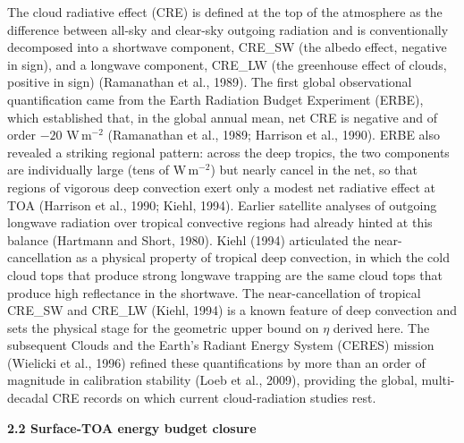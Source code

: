 The cloud radiative effect (CRE) is defined at the top of the atmosphere as the difference between all-sky and clear-sky outgoing radiation and is conventionally decomposed into a shortwave component, CRE_SW (the albedo effect, negative in sign), and a longwave component, CRE_LW (the greenhouse effect of clouds, positive in sign) (Ramanathan et al., 1989). The first global observational quantification came from the Earth Radiation Budget Experiment (ERBE), which established that, in the global annual mean, net CRE is negative and of order $-20$ W\,m$^{-2}$ (Ramanathan et al., 1989; Harrison et al., 1990). ERBE also revealed a striking regional pattern: across the deep tropics, the two components are individually large (tens of W\,m$^{-2}$) but nearly cancel in the net, so that regions of vigorous deep convection exert only a modest net radiative effect at TOA (Harrison et al., 1990; Kiehl, 1994). Earlier satellite analyses of outgoing longwave radiation over tropical convective regions had already hinted at this balance (Hartmann and Short, 1980). Kiehl (1994) articulated the near-cancellation as a physical property of tropical deep convection, in which the cold cloud tops that produce strong longwave trapping are the same cloud tops that produce high reflectance in the shortwave. The near-cancellation of tropical CRE_SW and CRE_LW (Kiehl, 1994) is a known feature of deep convection and sets the physical stage for the geometric upper bound on $\eta$ derived here. The subsequent Clouds and the Earth's Radiant Energy System (CERES) mission (Wielicki et al., 1996) refined these quantifications by more than an order of magnitude in calibration stability (Loeb et al., 2009), providing the global, multi-decadal CRE records on which current cloud-radiation studies rest.

\textbf{2.2 Surface-TOA energy budget closure}

